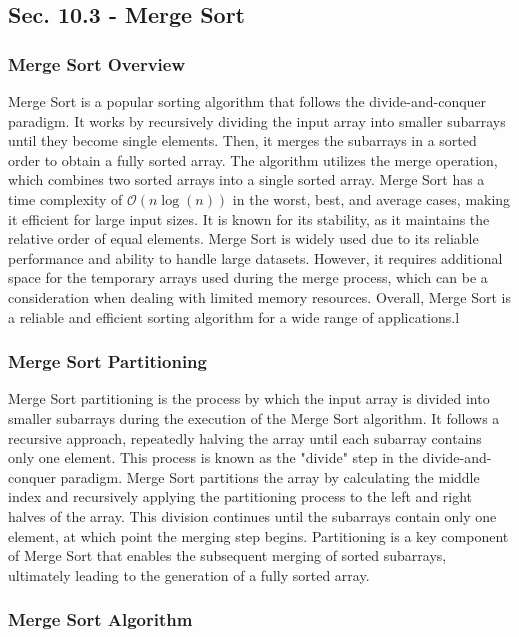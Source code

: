 \subsection*{Sec. 10.3 - Merge Sort}

\subsubsection{Merge Sort Overview}

Merge Sort is a popular sorting algorithm that follows the divide-and-conquer paradigm. It works by recursively dividing the input array into smaller subarrays until they become single elements. Then, it merges the subarrays in a sorted order to obtain a fully sorted array. The algorithm utilizes the merge operation, which combines two sorted arrays 
into a single sorted array. Merge Sort has a time complexity of $\mathcal{O}(n\log{(n)})$ in the worst, best, and average cases, making it efficient for large input sizes. It is known for its stability, as it maintains the relative order of equal elements. Merge Sort is widely used due to its reliable performance and ability to handle large datasets. However, it 
requires additional space for the temporary arrays used during the merge process, which can be a consideration when dealing with limited memory resources. Overall, Merge Sort is a reliable and efficient sorting algorithm for a wide range of applications.l

\subsubsection{Merge Sort Partitioning}

Merge Sort partitioning is the process by which the input array is divided into smaller subarrays during the execution of the Merge Sort algorithm. It follows a recursive approach, repeatedly halving the array until each subarray contains only one element. This process is known as the "divide" step in the divide-and-conquer paradigm. Merge Sort 
partitions the array by calculating the middle index and recursively applying the partitioning process to the left and right halves of the array. This division continues until the subarrays contain only one element, at which point the merging step begins. Partitioning is a key component of Merge Sort that enables the subsequent merging of sorted 
subarrays, ultimately leading to the generation of a fully sorted array.

\subsubsection{Merge Sort Algorithm}

